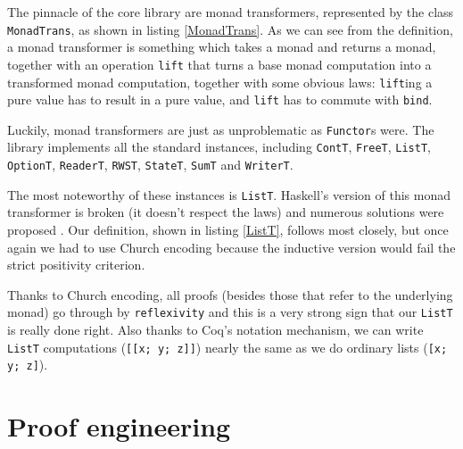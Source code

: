 \documentclass[declaration,inz,english,shortabstract]{iithesis}
\newcommand{\m}[1]{\texttt{#1}}
\begin{document}

The pinnacle of the core library are monad transformers, represented by the class \m{MonadTrans}, as shown in listing \ref{MonadTrans}. As we can see from the definition, a monad transformer is something which takes a monad and returns a monad, together with an operation \m{lift} that turns a base monad computation into a transformed monad computation, together with some obvious laws: \m{lift}ing a pure value has to result in a pure value, and \m{lift} has to commute with \m{bind}.

Luckily, monad transformers are just as unproblematic as \m{Functor}s were. The library implements all the standard instances, including \m{ContT}, \m{FreeT}, \m{ListT}, \m{OptionT}, \m{ReaderT}, \m{RWST}, \m{StateT}, \m{SumT} and \m{WriterT}.


The most noteworthy of these instances is \m{ListT}. Haskell's version of this monad transformer is broken (it doesn't respect the laws) and numerous solutions were proposed \cite{ListT1} \cite{ListT2} \cite{ListT3}. Our definition, shown in listing \ref{ListT}, follows \cite{ListT1} most closely, but once again we had to use Church encoding because the inductive version would fail the strict positivity criterion.

Thanks to Church encoding, all proofs (besides those that refer to the underlying monad) go through by \m{reflexivity} and this is a very strong sign that our \m{ListT} is really done right. Also thanks to Coq's notation mechanism, we can write \m{ListT} computations (\m{[[x; y; z]]}) nearly the same as we do ordinary lists (\m{[x; y; z]}).

\section{Proof engineering}
\end{document}
